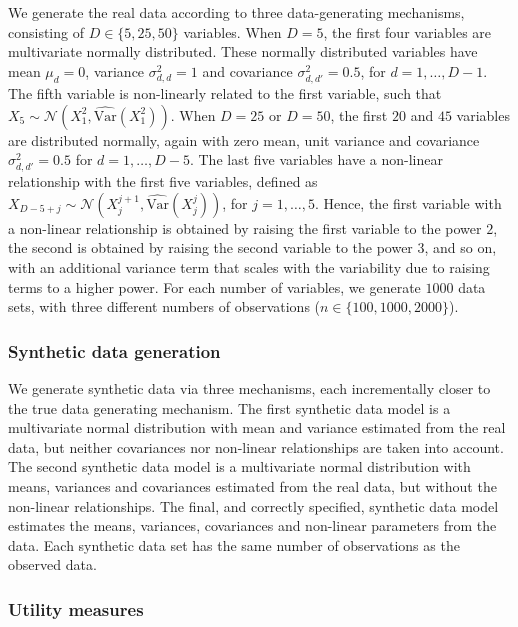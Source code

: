 \documentclass[
]{article}
\begin{document}
We generate the real data according to three data-generating mechanisms,
consisting of \(D \in \{5, 25, 50\}\) variables. When \(D = 5\), the
first four variables are multivariate normally distributed. These
normally distributed variables have mean \(\mu_d = 0\), variance
\(\sigma^2_{d,d} = 1\) and covariance \(\sigma^2_{d,d'} = 0.5\), for
\(d = 1, \dots, D-1\). The fifth variable is non-linearly related to the
first variable, such that
\(X_5 \sim \mathcal{N}(X_1^2, \hat{\text{Var}}(X_1^2))\). When
\(D = 25\) or \(D = 50\), the first \(20\) and \(45\) variables are
distributed normally, again with zero mean, unit variance and covariance
\(\sigma^2_{d,d'} = 0.5\) for \(d = 1, \dots, D-5\). The last five
variables have a non-linear relationship with the first five variables,
defined as
\(X_{D-5+j} \sim \mathcal{N}(X_j^{j+1}, \hat{\text{Var}}(X_j^j))\), for
\(j = 1, \dots, 5\). Hence, the first variable with a non-linear
relationship is obtained by raising the first variable to the power
\(2\), the second is obtained by raising the second variable to the
power \(3\), and so on, with an additional variance term that scales
with the variability due to raising terms to a higher power. For each
number of variables, we generate \(1000\) data sets, with three
different numbers of observations (\(n \in \{100, 1000, 2000\}\)).

\subsubsection{Synthetic data
generation}\label{synthetic-data-generation}

We generate synthetic data via three mechanisms, each incrementally
closer to the true data generating mechanism. The first synthetic data
model is a multivariate normal distribution with mean and variance
estimated from the real data, but neither covariances nor non-linear
relationships are taken into account. The second synthetic data model is
a multivariate normal distribution with means, variances and covariances
estimated from the real data, but without the non-linear relationships.
The final, and correctly specified, synthetic data model estimates the
means, variances, covariances and non-linear parameters from the data.
Each synthetic data set has the same number of observations as the
observed data.

\subsubsection{Utility measures}\label{utility-measures}
\end{document}
